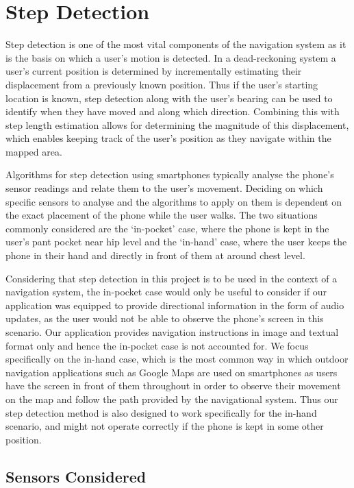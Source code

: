\documentclass[12pt,a4paper,notitlepage]{report}
\begin{document}
\chapter*{Step Detection}

Step detection is one of the most vital components of the navigation system as it is the basis on which a user's motion is detected. In a dead-reckoning system a user's current position is determined by incrementally estimating their displacement from a previously known position. Thus if the user's starting location is known, step detection along with the user's bearing can be used to identify when they have moved and along which direction. Combining this with step length estimation allows for determining the magnitude of this displacement, which enables keeping track of the user's position as they navigate within the mapped area. 

Algorithms for step detection using smartphones typically analyse the phone's sensor readings and relate them to the user's movement. Deciding on which specific sensors to analyse and the algorithms to apply on them is dependent on the exact placement of the phone while the user walks. The two situations commonly considered are the `in-pocket' case, where the phone is kept in the user's pant pocket near hip level and the `in-hand' case, where the user keeps the phone in their hand and directly in front of them at around chest level. 

Considering that step detection in this project is to be used in the context of a navigation system, the in-pocket case would only be useful to consider if our application was equipped to provide directional information in the form of audio updates, as the user would not be able to observe the phone's screen in this scenario. Our application provides navigation instructions in image and textual format only and hence the in-pocket case is not accounted for. We focus specifically on the in-hand case, which is the most common way in which outdoor navigation applications such as Google Maps are used on smartphones as users have the screen in front of them throughout in order to observe their movement on the map and follow the path provided by the navigational system. Thus our step detection method is also designed to work specifically for the in-hand scenario, and might not operate correctly if the phone is kept in some other position.  

\section*{Sensors Considered}
\end{document}
